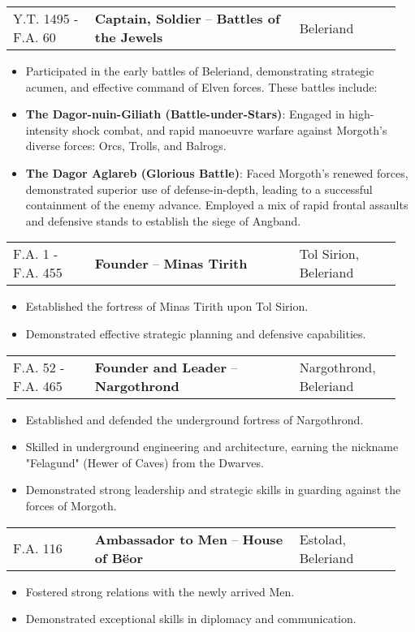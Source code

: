 \documentclass[a4paper, 10pt]{article}
\makeatletter
\newcommand{\entry}[4]{
    \vspace{6pt}
    \footnotesize
    \noindent
    \begin{tabular}{@{} p{0.2\linewidth} p{0.5\linewidth} p{0.25\linewidth} @{}}
        {#4} & \textbf{#1} -- \textbf{#2} & \hfill{#3} \\
    \end{tabular}
    \vspace{4pt}
}
\makeatother
\begin{document}
\entry{Captain, Soldier}{Battles of the Jewels}{Beleriand}{Y.T. 1495 - F.A. 60}
\begin{itemize}[left=0.25\linewidth, noitemsep, before=\small]
\footnotesize
    \footnotesize
    \item Participated in the early battles of Beleriand, demonstrating strategic acumen, and effective command of Elven forces. These battles include:
    \item \textbf{The Dagor-nuin-Giliath (Battle-under-Stars)}: Engaged in high-intensity shock combat, and rapid manoeuvre warfare against Morgoth's diverse forces: Orcs, Trolls, and Balrogs.
    \item \textbf{The Dagor Aglareb (Glorious Battle)}: Faced Morgoth's renewed forces, demonstrated superior use of defense-in-depth, leading to a successful containment of the enemy advance. Employed a mix of rapid frontal assaults and defensive stands to establish the siege of Angband.
\end{itemize}

\entry{Founder}{Minas Tirith}{Tol Sirion, Beleriand}{F.A. 1 - F.A. 455}
\begin{itemize}[left=0.25\linewidth, noitemsep, before=\small]
    \footnotesize
    \item Established the fortress of Minas Tirith upon Tol Sirion.
    \item Demonstrated effective strategic planning and defensive capabilities.
\end{itemize}


\entry{Founder and Leader}{Nargothrond}{Nargothrond, Beleriand}{F.A. 52 - F.A. 465}
\begin{itemize}[left=0.25\linewidth, noitemsep, before=\small]
    \footnotesize
    \item Established and defended the underground fortress of Nargothrond.
    \item Skilled in underground engineering and architecture, earning the nickname "Felagund" (Hewer of Caves) from the Dwarves.
    \item Demonstrated strong leadership and strategic skills in guarding against the forces of Morgoth.
\end{itemize}

\entry{Ambassador to Men}{House of Bëor}{Estolad, Beleriand}{F.A. 116}
\begin{itemize}[left=0.25\linewidth, noitemsep, before=\small]
    \footnotesize
    \item Fostered strong relations with the newly arrived Men.
    \item Demonstrated exceptional skills in diplomacy and communication.
\end{itemize}
\end{document}
